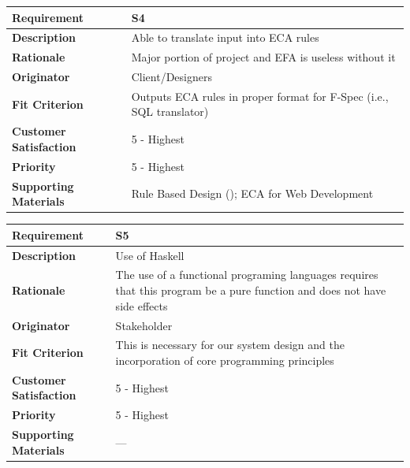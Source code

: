\documentclass[12pt]{report}
\begin{document}
{\setlength{\tabcolsep}{12pt} %
\begin{tabularx}{\textwidth}{>{\bfseries}m{3cm}X}
Requirement & S4 \\ 
\midrule
\endhead
	Description  & Able to translate input into ECA rules 
	\\	Rationale & Major portion of project and EFA is useless without it
	\\	Originator & Client/Designers 

	\\	Fit Criterion & Outputs ECA rules in proper format for F-Spec (i.e., 
	SQL translator)
	\\	Customer Satisfaction & 5 - Highest 
	\\	Priority & 5 - Highest 
	\\	Supporting Materials & Rule Based Design (\cite{RBD}); ECA for Web Development %
\vspace{12pt}
\end{tabularx}
}
{\setlength{\tabcolsep}{12pt} %
	\begin{tabularx}{\textwidth}{>{\bfseries}m{3cm}X}
		Requirement & S5 \\ 
		\midrule
		\endhead
		Description  & Use of Haskell
		\\	Rationale & The use of a functional programing languages requires 
		that this program be a pure function and does not have side effects
		\\	Originator & Stakeholder 
		
		\\	Fit Criterion & This is necessary for our system design and the 
		incorporation of 
		core programming principles
		\\	Customer Satisfaction & 5 - Highest 
		\\	Priority & 5 - Highest 
		\\	Supporting Materials & ---
		\vspace{12pt}
	\end{tabularx}
}

\end{document}
